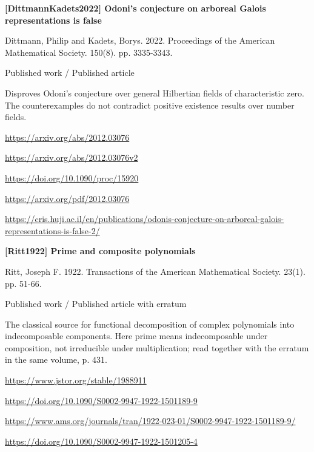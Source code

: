 \documentclass[11pt,a4paper,oneside,openany]{book}
\begin{document}
\vspace{9pt}
\hypertarget{ref:DittmannKadets2022}{}
{\sffamily\bfseries\color{atlasgreen}[DittmannKadets2022] Odoni's conjecture on arboreal Galois representations is false}\par
\color{black} Dittmann, Philip and Kadets, Borys. 2022. Proceedings of the American Mathematical Society. 150(8). pp. 3335-3343.\par
{\small\sffamily\color{atlasgold}Published work / Published article}\par
\color{black} Disproves Odoni's conjecture over general Hilbertian fields of characteristic zero. The counterexamples do not contradict positive existence results over number fields.\par
{\footnotesize\url{https://arxiv.org/abs/2012.03076}}\par
{\footnotesize\url{https://arxiv.org/abs/2012.03076v2}}\par
{\footnotesize\url{https://doi.org/10.1090/proc/15920}}\par
{\footnotesize\url{https://arxiv.org/pdf/2012.03076}}\par
{\footnotesize\url{https://cris.huji.ac.il/en/publications/odonis-conjecture-on-arboreal-galois-representations-is-false-2/}}\par
\vspace{9pt}
\hypertarget{ref:Ritt1922}{}
{\sffamily\bfseries\color{atlasgreen}[Ritt1922] Prime and composite polynomials}\par
\color{black} Ritt, Joseph F. 1922. Transactions of the American Mathematical Society. 23(1). pp. 51-66.\par
{\small\sffamily\color{atlasgold}Published work / Published article with erratum}\par
\color{black} The classical source for functional decomposition of complex polynomials into indecomposable components. Here prime means indecomposable under composition, not irreducible under multiplication; read together with the erratum in the same volume, p. 431.\par
{\footnotesize\url{https://www.jstor.org/stable/1988911}}\par
{\footnotesize\url{https://doi.org/10.1090/S0002-9947-1922-1501189-9}}\par
{\footnotesize\url{https://www.ams.org/journals/tran/1922-023-01/S0002-9947-1922-1501189-9/}}\par
{\footnotesize\url{https://doi.org/10.1090/S0002-9947-1922-1501205-4}}\par
\end{document}
